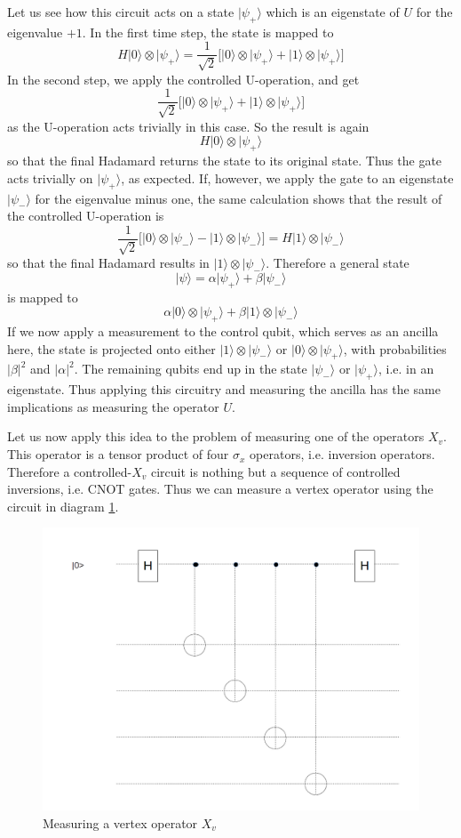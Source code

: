 \documentclass[a4paper, draft]{article}
\theoremstyle{own}
\theoremstyle{remark}
\begin{document}
Let us see how this circuit acts on a state $|\psi_+ \rangle$ which is an eigenstate of $U$ for the eigenvalue $+1$. In the first time step, the state is mapped to
$$
H|0 \rangle \otimes | \psi_+ \rangle = \frac{1}{\sqrt{2}} \big[ |0 \rangle \otimes | \psi_+ \rangle + | 1 \rangle \otimes | \psi_+ \rangle \big]
$$
In the second step, we apply the controlled U-operation, and get
$$
\frac{1}{\sqrt{2}} \big[ |0 \rangle \otimes | \psi_+ \rangle + | 1 \rangle \otimes | \psi_+ \rangle \big]
$$
as the U-operation acts trivially in this case. So the result is again
$$
H|0 \rangle \otimes | \psi_+ \rangle
$$
so that the final Hadamard returns the state to its original state. Thus the gate acts trivially on $|\psi_+ \rangle$, as expected. If, however, we apply the gate to an eigenstate $|\psi_- \rangle$ for the eigenvalue minus one, the same calculation shows that the result of the controlled U-operation is
$$
\frac{1}{\sqrt{2}} \big[ |0 \rangle \otimes | \psi_- \rangle - | 1 \rangle \otimes | \psi_- \rangle \big] = H|1 \rangle \otimes |\psi_- \rangle
$$
so that the final Hadamard results in $|1 \rangle \otimes |\psi_- \rangle$. Therefore a general state
$$
|\psi \rangle = \alpha |\psi_+ \rangle + \beta |\psi_- \rangle
$$
is mapped to
$$
\alpha |0 \rangle \otimes |\psi_+\rangle + \beta |1 \rangle \otimes |\psi_- \rangle
$$
If we now apply a measurement to the control qubit, which serves as an ancilla here, the state is projected onto either $|1 \rangle \otimes |\psi_- \rangle$ or $|0 \rangle \otimes |\psi_+ \rangle$, with probabilities $|\beta|^2$ and $|\alpha|^2$. The remaining qubits end up in the state $|\psi_-\rangle$ or $|\psi_+ \rangle$, i.e. in an eigenstate. Thus applying this circuitry and measuring the ancilla has the same implications as measuring the operator $U$.

Let us now apply this idea to the problem of measuring one of the operators $X_v$. This operator is a tensor product of four $\sigma_x$ operators, i.e. inversion operators. Therefore a controlled-$X_v$ circuit is nothing but a sequence of controlled inversions, i.e. CNOT gates. Thus we can measure a vertex operator using the circuit in diagram \ref{fig:MeasuringXfI}.

\begin{figure}[ht]
\centering
\includegraphics[width=0.7\linewidth]{images/MeasuringXfI}
\caption{Measuring a vertex operator $X_v$}
\label{fig:MeasuringXfI}
\end{figure}
\end{document}
